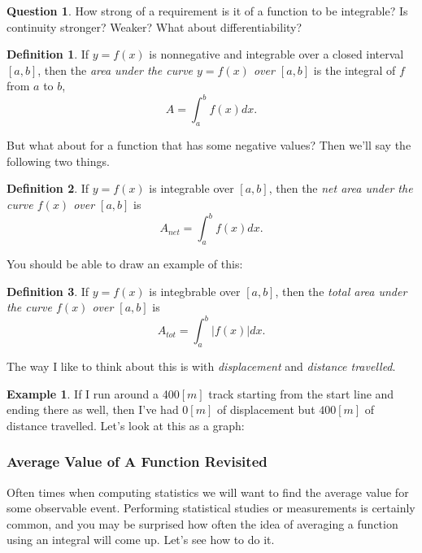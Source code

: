 \documentclass[leqno]{article}
\theoremstyle{definition}
\newtheorem{definition}{Definition}[section]
\newtheorem{example}{Example}[section]
\newtheorem{question}{Question}[section]
\theoremstyle{remark}
\theoremstyle{theorem}
\begin{document}
\begin{question}
How strong of a requirement is it of a function to be integrable? Is continuity stronger? Weaker? What about differentiability?
\end{question}

\begin{definition}
If $y=f(x)$ is nonnegative and integrable over a closed interval $[a,b]$, then the \emph{area under the curve $y=f(x)$ over $[a,b]$} is the integral of $f$ from $a$ to $b$,
\[
A=\int_a^b f(x) dx.
\]
\end{definition}

But what about for a function that has some negative values? Then we'll say the following two things.

\begin{definition}
If $y=f(x)$ is integrable over $[a,b]$, then the \emph{net area under the curve $f(x)$ over $[a,b]$} is
\[
A_{net} = \int_a^b f(x)dx.
\]
\end{definition}
You should be able to draw an example of this:
\vspace*{4cm}\\

\begin{definition}
If $y=f(x)$ is integbrable over $[a,b]$, then the \emph{total area under the curve $f(x)$ over $[a,b]$} is
\[
A_{tot} = \int_a^b |f(x)|dx.
\]
\end{definition}

The way I like to think about this is with \emph{displacement} and \emph{distance travelled}.

\begin{example}
If I run around a 400$[m]$ track starting from the start line and ending there as well, then I've had $0 [m]$ of displacement but $400[m]$ of distance travelled. Let's look at this as a graph:
\vspace*{4cm}\\
\end{example}

\subsubsection{Average Value of A Function Revisited}

Often times when computing statistics we will want to find the average value for some observable event. Performing statistical studies or measurements is certainly common, and you may be surprised how often the idea of averaging a function using an integral will come up.  Let's see how to do it.
\end{document}
